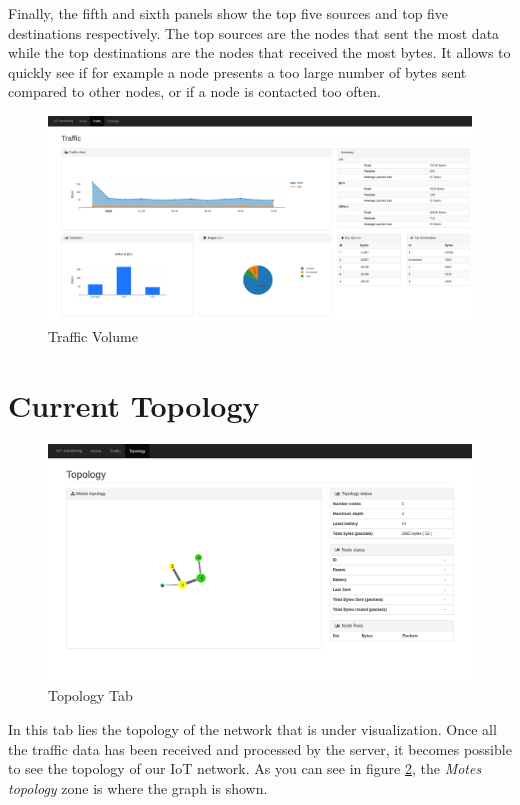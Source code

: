 Finally, the fifth and sixth panels show the top five sources and top five destinations respectively. The top sources are the nodes that sent the most data while the top destinations are the nodes that received the most bytes. It allows to quickly see if for example a node presents a too large number of bytes sent compared to other nodes, or if a node is contacted too often.

\begin{figure}
	\centering
	\includegraphics[width=\textwidth]{res/traffic.png}
	\caption{Traffic Volume}
	\label{fig:tool_traffic}
\end{figure}

\section{Current Topology}

\begin{figure}[!h]
	\centering
	\includegraphics[width=1.1\textwidth]{res/topology_interface.png}
	\caption{Topology Tab}
	\label{fig:topo}
\end{figure}

In this tab lies the topology of the network that is under visualization. Once all the traffic data has been received and processed by the server, it becomes possible to see the topology of our IoT network. As you can see in figure \ref{fig:topo}, the \textit{Motes topology} zone is where the graph is shown. \\

